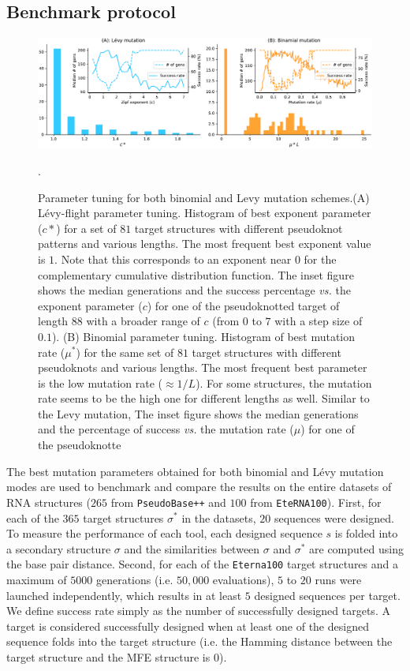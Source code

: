 \subsection{Benchmark protocol}
\begin{figure}[t!]
	\centering
	\includegraphics[width=1.0\linewidth]{../res/images/arnaque/Tuning.pdf}
	\caption{Parameter tuning for both binomial and Levy mutation schemes.(A) Lévy-flight parameter tuning. Histogram of best exponent parameter ($c*$) for a set of $81$ target structures with different pseudoknot patterns and various lengths. The most frequent best exponent value is $1$. Note that this corresponds to an exponent near 0 for the complementary cumulative distribution function. The inset figure shows the median generations and the success percentage \emph{vs.} the exponent parameter ($c$) for one of the pseudoknotted target of length $88$ with a broader range of $c$ (from $0$ to $7$ with a step size of $0.1$). (B) Binomial parameter tuning. Histogram of best mutation rate ($\mu^*$) for the same set of $81$ target structures with different pseudoknots and various lengths. The most frequent best parameter is the low mutation rate ($\approx 1/L$). For some structures, the mutation rate seems to be the high one for different lengths as well. Similar to the Levy mutation, The inset figure shows the median generations and the percentage of success \emph{vs.} the mutation rate ($\mu$) for one of the pseudoknotte} \label{Fig:tunning}
	\medskip
	\small.
\end{figure}
The best mutation parameters obtained for both binomial and Lévy mutation modes are used to benchmark and compare the results on the entire datasets of RNA structures ($265$ from \texttt{PseudoBase++} and $100$ from \texttt{EteRNA100}). First, for each of the $365$ target structures $\sigma^*$ in the datasets, $20$ sequences were designed. To measure the performance of each tool, each designed sequence $s$ is folded into a secondary structure $\sigma$ and the similarities between $\sigma$ and $\sigma^*$ are computed using the base pair distance. Second, for each of the \texttt{Eterna100} target structures and a maximum of $5000$ generations (i.e. $50,000$ evaluations), $5$ to $20$ runs were launched independently, which results in at least $5$ designed sequences per target. We define success rate simply as the number of successfully designed targets. A target is considered successfully designed when at least one of the designed sequence folds into the target structure (i.e. the Hamming distance between the target structure and the MFE structure is $0$).

